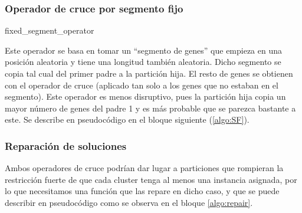 \documentclass[11pt,a4paper]{article}
\begin{document}
    \subsubsection{Operador de cruce por segmento fijo}
    
     \begin{algorithm}[ht]
	 	\caption{fixed\_segment\_operator} \label{algo:SF}
	\end{algorithm} 
	Este operador se basa en tomar un ``segmento de genes'' que empieza en una posición aleatoria y tiene una longitud también aleatoria. Dicho segmento se copia tal cual del primer padre a la partición hija. El resto de genes se obtienen con el operador de cruce (aplicado tan solo a los genes que no estaban en el segmento). Este operador es menos disruptivo, pues la partición hija copia un mayor número de genes del padre 1 y es más probable que se parezca bastante a este. Se describe en pseudocódigo en el bloque siguiente (\ref{algo:SF}).
	\subsubsection{Reparación de soluciones}
	Ambos operadores de cruce podrían dar lugar a particiones que rompieran la restricción fuerte de que cada cluster tenga al menos una instancia asignada, por lo que necesitamos una función que las repare en dicho caso, y que se puede describir en pseudocódigo como se observa en el bloque \ref{algo:repair}.\\
	
\end{document}
